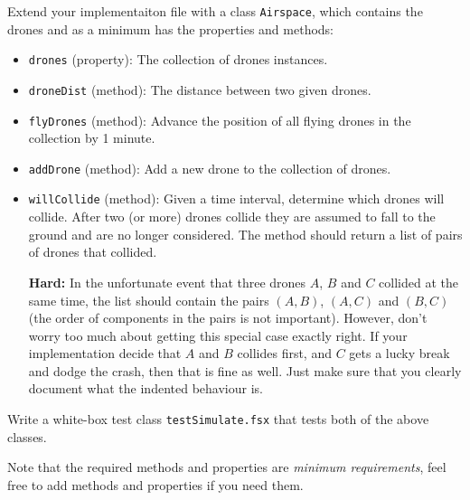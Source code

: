 Extend your implementaiton file with a class \lstinline{Airspace}, which contains the drones and as a minimum has the properties and methods:
\begin{itemize}
\item \lstinline{drones} (property): The collection of drones instances.
\item \lstinline{droneDist} (method): The distance between two given drones.
\item \lstinline{flyDrones} (method): Advance the position of all flying drones in the collection by 1 minute.
\item \lstinline{addDrone} (method): Add a new drone to the collection of drones.
\item \lstinline{willCollide} (method): Given a time interval,
  determine which drones will collide. After two (or more) drones
  collide they are assumed to fall to the ground and are no longer
  considered. The method should return a list of pairs of drones that
  collided.

  \textbf{Hard:} In the unfortunate event that three drones $A$, $B$
  and $C$ collided at the same time, the list should contain the pairs
  $(A,B)$, $(A, C)$ and $(B,C)$ (the order of components in the pairs
  is not important). However, don't worry too much about getting this
  special case exactly right. If your implementation decide that $A$
  and $B$ collides first, and $C$ gets a lucky break and dodge the
  crash, then that is fine as well. Just make sure that you clearly
  document what the indented behaviour is.
\end{itemize}

Write a white-box test class \lstinline{testSimulate.fsx} that tests
both of the above classes.

Note that the required methods and properties are \emph{minimum
  requirements}, feel free to add methods and properties if you need them.